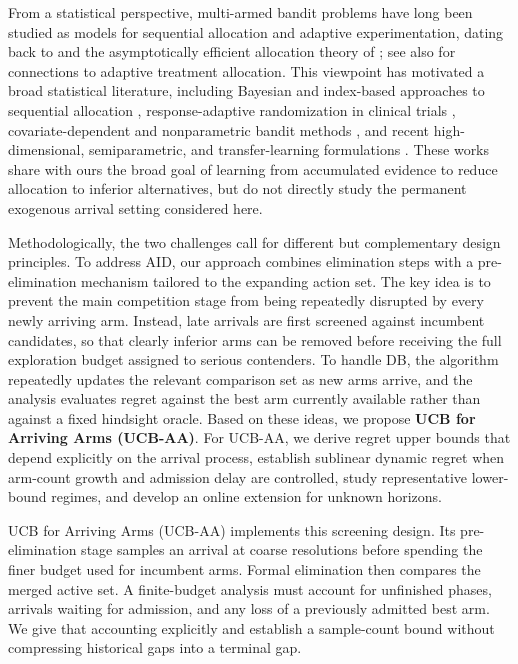 \documentclass[11pt]{article}
\begin{document}
From a statistical perspective, multi-armed bandit problems have long been studied as models for sequential allocation and adaptive experimentation, dating back to \citet{Robbins1952} and the asymptotically efficient allocation theory of \citet{LAI19854}; see also \citet{Lai1987} for connections to adaptive treatment allocation. This viewpoint has motivated a broad statistical literature, including Bayesian and index-based approaches to sequential allocation \citep{Gittins1979,BerryFristedt1985}, response-adaptive randomization in clinical trials \citep{Zelen1969,WeiDurham1978,VillarBowdenWason2015,WilliamsonVillar2020,AzizKaufmannRiviere2021}, covariate-dependent and nonparametric bandit methods \citep{Woodroofe1979,YangZhu2002,RigolletZeevi2010,PerchetRigollet2013}, and recent high-dimensional, semiparametric, and transfer-learning formulations \citep{QianYang2016,QianIngLiu2023,CaiCaiLi2024}. These works share with ours the broad goal of learning from accumulated evidence to reduce allocation to inferior alternatives, but do not directly study the permanent exogenous arrival setting considered here.

Methodologically, the two challenges call for different but complementary design principles. To address AID, our approach combines elimination steps \citep{EvenDar2006SE,Auer2010UCBRI,PerchetRigollet2013,QianYang2016} with a pre-elimination mechanism tailored to the expanding action set. The key idea is to prevent the main competition stage from being repeatedly disrupted by every newly arriving arm. Instead, late arrivals are first screened against incumbent candidates, so that clearly inferior arms can be removed before receiving the full exploration budget assigned to serious contenders. To handle DB, the algorithm repeatedly updates the relevant comparison set as new arms arrive, and the analysis evaluates regret against the best arm currently available rather than against a fixed hindsight oracle. 
Based on these ideas, we propose \textbf{UCB for Arriving Arms (UCB-AA)}. For UCB-AA, we derive regret upper bounds that depend explicitly on the arrival process, establish sublinear dynamic regret when arm-count growth and admission delay are controlled, study representative lower-bound regimes, and develop an online extension for unknown horizons.

UCB for Arriving Arms (UCB-AA) implements this screening design. Its
pre-elimination stage samples an arrival at coarse resolutions before spending
the finer budget used for incumbent arms. Formal elimination then compares the
merged active set. A finite-budget analysis must account for unfinished phases,
arrivals waiting for admission, and any loss of a previously admitted best arm.
We give that accounting explicitly and establish a sample-count bound without
compressing historical gaps into a terminal gap.
\end{document}
